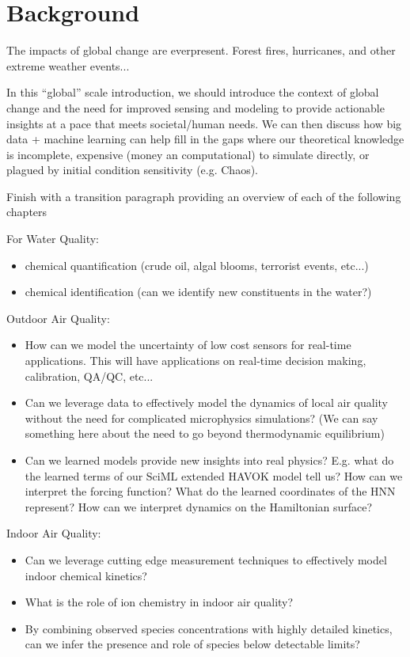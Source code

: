 \chapter{Background}

The impacts of global change are everpresent. Forest fires, hurricanes, and other extreme weather events...


In this ``global'' scale introduction, we should introduce the context of global change and the need for improved sensing and modeling to provide actionable insights at a pace that meets societal/human needs. We can then discuss how big data + machine learning can help fill in the gaps where our theoretical knowledge is incomplete, expensive (money an computational) to simulate directly, or plagued by initial condition sensitivity (e.g. Chaos).

Finish with a transition paragraph providing an overview of each of the following chapters

For Water Quality:
\begin{itemize}
\item chemical quantification (crude oil, algal blooms, terrorist events, etc...)
\item chemical identification (can we identify new constituents in the water?)
\end{itemize}

Outdoor Air Quality:
\begin{itemize}
\item How can we model the uncertainty of low cost sensors for real-time applications. This will have applications on real-time decision making, calibration, QA/QC, etc...
\item Can we leverage data to effectively model the dynamics of local air quality without the need for complicated microphysics simulations? (We can say something here about the need to go beyond thermodynamic equilibrium)
\item Can we learned models provide new insights into real physics? E.g. what do the learned terms of our SciML extended HAVOK model tell us? How can we interpret the forcing function? What do the learned coordinates of the HNN represent? How can we interpret dynamics on the Hamiltonian surface?
\end{itemize}


Indoor Air Quality:
\begin{itemize}
\item Can we leverage cutting edge measurement techniques to effectively model indoor chemical kinetics?
\item What is the role of ion chemistry in indoor air quality?
\item By combining observed species concentrations with highly detailed kinetics, can we infer the presence and role of species below detectable limits?
\end{itemize}

